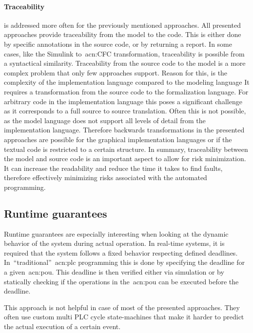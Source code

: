 \paragraph{Traceability} is addressed more often for the previously mentioned approaches.
All presented approaches provide traceability from the model to the code.
This is either done by specific annotations in the source code, or by returning a report.
In some cases, like the Simulink to~\acrshort{acn:CFC} transformation, traceability is possible from a syntactical similarity.
Traceability from the source code to the model is a more complex problem that only few approaches support.
Reason for this, is the complexity of the implementation language compared to the modeling language
It requires a transformation from the source code to the formalization language.
For arbitrary code in the implementation language this poses a significant challenge as it corresponds to a full source to source translation.
Often this is not possible, as the model language does not support all levels of detail from the implementation language.
Therefore backwards transformations in the presented approaches are possible for the graphical implementation languages or if the textual code is restricted to a certain structure.
In summary, traceability between the model and source code is an important aspect to allow for risk minimization.
It can increase the readability and reduce the time it takes to find faults, therefore effectively minimizing risks associated with the automated programming.

\subsection{Runtime guarantees}
\label{sec:sub:rt}
Runtime guarantees are especially interesting when looking at the dynamic behavior of the system during actual operation.
In real-time systems, it is required that the system follows a fixed behavior respecting defined deadlines.
In~\enquote{traditional}~\acrshort{acn:plc} programming this is done by specifying the deadline for a given~\acrfull{acn:pou}.
This deadline is then verified either via simulation or by statically checking if the operations in the~\acrshort{acn:pou} can be executed before the deadline.

This approach is not helpful in case of most of the presented approaches.
They often use custom multi PLC cycle state-machines that make it harder to predict the actual execution of a certain event.


